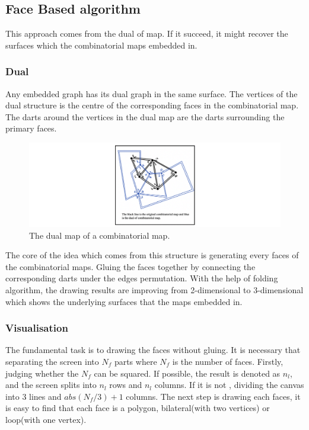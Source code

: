   \subsection{Face Based algorithm}
  This approach comes from the dual of map. If it succeed, it might recover the surfaces which the  combinatorial maps embedded in.

  \subsubsection{Dual}
  Any embedded graph has its dual graph in the same surface. The vertices of the dual structure is the centre of the corresponding faces in the combinatorial map. The darts around the vertices in the dual map are the darts surrounding the primary faces.

  \begin{figure}[htb]
    \centering
    \includegraphics[width=1\textwidth]{../../image/dual.png}
    \caption{The dual map of  a combinatorial map.}
    \label{fig:figures:dual}
  \end{figure}

  The core of the idea which comes from this structure is generating every faces of the combinatorial maps. Gluing the faces together by connecting the corresponding darts under the edges permutation. With the help of folding algorithm, the drawing results are improving from 2-dimensional to 3-dimensional which shows the underlying surfaces that the maps embedded in.

  \subsubsection{Visualisation}
  The fundamental task is to drawing the faces without gluing. It is necessary that separating the screen into \(N_f\) parts where \(N_f\) is the number of faces. Firstly, judging whether the \(N_f\) can be squared. If possible, the result is denoted as \(n_l\), and the screen splits into \(n_l\) rows and \(n_l\) columns. If it is not , dividing the canvas into 3 lines and \(abs(N_f/3)+1\) columns. The next step is drawing each faces, it is easy to find that each face is a polygon, bilateral(with two vertices) or loop(with one vertex).

